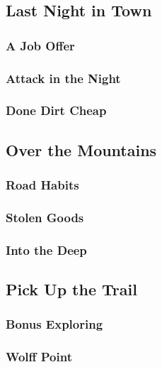 

\subsection{Last Night in Town}


\subsubsection{A Job Offer}


\subsubsection{Attack in the Night}


\subsubsection{Done Dirt Cheap}


\subsection{Over the Mountains}


\subsubsection{Road Habits}


\subsubsection{Stolen Goods}


\subsubsection{Into the Deep}


\subsection{Pick Up the Trail}


\subsubsection{Bonus Exploring}


\subsubsection{Wolff Point}

